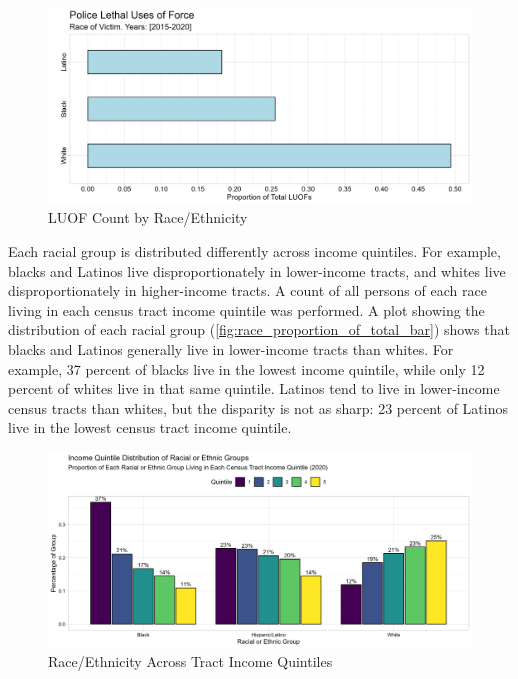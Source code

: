 \documentclass[12pt]{article}
\begin{document}
\begin{figure}[H]
  \centering
  \includegraphics[width=\linewidth]{images/race_proportion_of_total_bar}
  \captionsetup{justification=centering, singlelinecheck=false, margin=2cm}
  \caption{LUOF Count by Race/Ethnicity}
  \label{fig:race_proportion_of_total_bar}
\end{figure}

Each racial group is distributed differently across income quintiles. For example, blacks and Latinos live disproportionately in lower-income tracts, and whites live disproportionately in higher-income tracts. A count of all persons of each race living in each census tract income quintile was performed. A plot showing the distribution of each racial group (\autoref{fig:race_proportion_of_total_bar}) shows that blacks and Latinos generally live in lower-income tracts than whites. For example, 37 percent of blacks live in the lowest income quintile, while only 12 percent of whites live in that same quintile. Latinos tend to live in lower-income census tracts than whites, but the disparity is not as sharp: 23 percent of Latinos live in the lowest census tract income quintile.

\begin{figure}[H]
  \centering
  \includegraphics[width=\linewidth]{images/total_pop_quintiles_race}
  \captionsetup{justification=centering, singlelinecheck=false, margin=2cm}
  \caption{Race/Ethnicity Across Tract Income Quintiles}
  \label{fig:total_pop_quintiles_race}
\end{figure}
\end{document}
